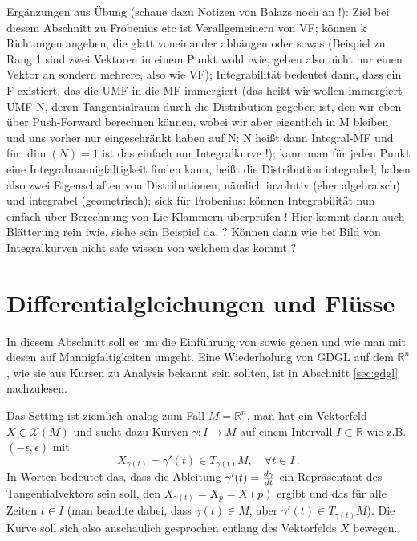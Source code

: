 \documentclass[../H_Analysis_main.tex]{subfiles}
\begin{document}
Ergänzungen aus Übung (schaue dazu Notizen von Balazs noch an !): Ziel bei diesem Abschnitt zu Frobenius etc ist Verallgemeinern von VF; können k Richtungen angeben, die glatt voneinander abhängen oder sowas (Beispiel zu Rang 1 sind zwei Vektoren in einem Punkt wohl iwie; geben also nicht nur einen Vektor an sondern mehrere, also wie VF); Integrabilität bedeutet dann, dass ein F existiert, das die UMF in die MF immergiert (das heißt wir wollen immergiert UMF N, deren Tangentialraum durch die Distribution gegeben ist, den wir eben über Push-Forward berechnen können, wobei wir aber eigentlich in M bleiben und uns vorher nur eingeschränkt haben auf N; N heißt dann Integral-MF und für $\dim(N) = 1$ ist das einfach nur Integralkurve !); kann man für jeden Punkt eine Integralmannigfaltigkeit finden kann, heißt die Distribution integrabel; haben also zwei Eigenschaften von Distributionen, nämlich involutiv (eher algebraisch) und integrabel (geometrisch); sick für Frobenius: können Integrabilität nun einfach über Berechnung von Lie-Klammern überprüfen ! Hier kommt dann auch Blätterung rein iwie, siehe sein Beispiel da. ? Können dann wie bei Bild von Integralkurven nicht safe wissen von welchem das kommt ?


\newpage


	\section{Differentialgleichungen und Flüsse}\label{sec:gdgl2}
In diesem Abschnitt soll es um die Einführung von  sowie  gehen und wie man mit diesen auf Mannigfaltigkeiten umgeht. Eine Wiederholung von GDGL auf dem $\mathbb{R}^n$, wie sie aus Kursen zu Analysis bekannt sein sollten, ist in Abschnitt \ref{sec:gdgl} nachzulesen.


Das Setting ist ziemlich analog zum Fall $M = \mathbb{R}^n$, man hat ein Vektorfeld $X \in \mathcal{X}(M)$ und sucht dazu Kurven $\gamma: I \rightarrow M$ auf einem Intervall $I \subset \mathbb{R}$ wie z.B. $(-\epsilon, \epsilon)$ mit
\begin{equation*}
X_{\gamma(t)} = \gamma'(t) \in T_{\gamma(t)} M, \quad \forall t \in I \, .
\end{equation*}
In Worten bedeutet das, dass die Ableitung $\gamma'(t) = \dv{\gamma}{t}$ ein Repräsentant des Tangentialvektors sein soll, den $X_{\gamma(t)} = X_p = X(p)$ ergibt und das für alle Zeiten $t \in I$ (man beachte dabei, dass $\gamma(t) \in M$, aber $\gamma'(t) \in T_{\gamma(t)} M$). Die Kurve soll sich also anschaulich gesprochen entlang des Vektorfelds $X$ bewegen.
\end{document}
